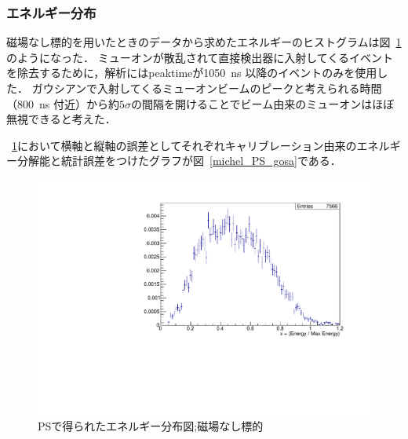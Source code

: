   
  \subsubsection{エネルギー分布}
  磁場なし標的を用いたときのデータから求めたエネルギーのヒストグラムは図~\ref{michel_PS}のようになった．
  ミューオンが散乱されて直接検出器に入射してくるイベントを除去するために，解析にはpeaktimeが1050~ns 以降のイベントのみを使用した．
  ガウシアンで入射してくるミューオンビームのピークと考えられる時間（800~ns 付近）から約$5\sigma$の間隔を開けることでビーム由来のミューオンはほぼ無視できると考えた．
  
  ~\ref{michel_PS}において横軸と縦軸の誤差としてそれぞれキャリブレーション由来のエネルギー分解能と統計誤差をつけたグラフが図~\ref{michel_PS_gosa}である．
  \begin{figure}[H]
   \centering
   \includegraphics[height = 0.7\columnwidth , angle = -90]{figure/ikemitsu/michel_PS.pdf}
   \caption{PSで得られたエネルギー分布図;磁場なし標的}
   \label{michel_PS}
  \end{figure}
  
